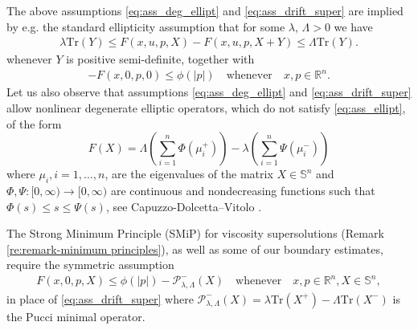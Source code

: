 \documentclass[12pt]{article}
\numberwithin{komcounter}{section}
\begin{document}
The above assumptions \eqref{eq:ass_deg_ellipt} and \eqref{eq:ass_drift_super} are implied by e.g. the standard ellipticity assumption that for some $\lambda$, $\Lambda > 0$ we have
%
\begin{align}\label{eq:ass_ellipt}
\lambda \text{Tr}(Y) \leq F(x,u,p,X) - F(x,u,p,X + Y) \leq \Lambda \text{Tr}(Y). %
\end{align}
%
whenever $Y$ is positive semi-definite, together with
%
\begin{align}\label{eq:ass_drift_super_old}
-F(x,0,p,0) \leq \phi(|p|) \quad \text{whenever} \quad x, p \in \mathbb{R}^n.
\end{align}
%
Let us also observe that assumptions \eqref{eq:ass_deg_ellipt} and \eqref{eq:ass_drift_super} allow nonlinear degenerate
elliptic operators, which do not satisfy \eqref{eq:ass_ellipt}, of the form
%
$$
F(X) = \Lambda \left( \sum_{i=1}^{n} \Phi(\mu_i^+)\right) - \lambda \left( \sum_{i=1}^{n} \Psi(\mu_i^-) \right)
$$
%
where $\mu_i, i = 1,\dots,n$, are the eigenvalues of the matrix $X \in \mathbb{S}^n$ and $\Phi, \Psi : [0,\infty) \to [0,\infty)$
are continuous and nondecreasing functions such that $\Phi(s) \leq s \leq \Psi(s)$, see Capuzzo-Dolcetta--Vitolo \cite{CV07}.

The Strong Minimum Principle (SMiP) for viscosity supersolutions (Remark \ref{re:remark-minimum principles}), as well as some of our boundary estimates, require the symmetric assumption
%
\begin{align}\label{eq:ass_drift_sub}
F(x,0,p,X) \leq \phi(|p|) - \mathcal{P}^-_{\lambda,\Lambda}(X) \quad \text{whenever} \quad x, p \in \mathbb{R}^n, X \in \mathbb{S}^n,
\tag{$F_2 B$}
\end{align}
%
in place of \eqref{eq:ass_drift_super} where $\mathcal{P}^-_{\lambda,\Lambda}(X) = \lambda \text{Tr}(X^+) - \Lambda \text{Tr}(X^-)$ is the Pucci minimal operator.


\end{document}
